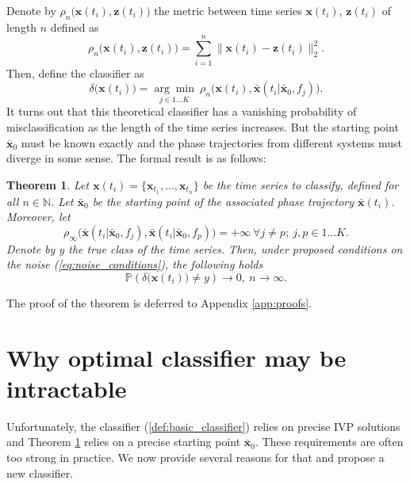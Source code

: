 \documentclass[referee, pdflatex, sn-mathphys-num]{sn-jnl}
\theoremstyle{definition}
\theoremstyle{plain}
\newtheorem{Th}{Theorem}
\newcommand{\bz}{\ensuremath{\mathbf{z}}}
\newcommand{\bx}{\ensuremath{\mathbf{x}}}
\newcommand{\bbx}{\ensuremath{\bar{\mathbf{x}}}}
\begin{document}
	Denote by $\rho_n\big( \bx(t_i), \bz(t_i) \big)$ the metric between time series $\bx(t_i)$, $\bz(t_i)$ of length $n$ defined as
	\begin{equation}\label{def:series_distance}
		\rho_n\big( \bx(t_i), \bz(t_i) \big) = \sum\limits_{i=1}^n \lVert \bx(t_i) - \bz(t_i) \rVert_2^2.
	\end{equation}
	Then, define the classifier as
	\begin{equation}\label{def:basic_classifier}
		\delta \big( \bx(t_i) \big) = \underset{j \in 1 \ldots K}{\arg\min} \ \rho_n\big( \bx(t_i), \bbx(t_i | \bbx_0, f_j) \big).
	\end{equation}
	It turns out that this theoretical classifier has a vanishing probability of misclassification as the length of the time series increases. But the starting point $\bbx_0$ must be known exactly and the phase trajectories from different systems must diverge in some sense. The formal result is as follows:
	\begin{Th}\label{thm:asympt_optimal}
		Let $\bx(t_i)= \{\bx_{t_1}, \ldots, \bx_{t_n}\}$ be the time series to classify, defined for all $n \in \mathbb{N}$. Let $\bbx_0$ be the starting point of the associated phase trajectory $\bbx(t_i)$. Moreover, let
		\begin{equation*}
			\rho_{\infty} \big( \bbx(t_i | \bbx_0, f_j), \bbx(t_i | \bbx_0, f_p) \big) = +\infty \ \forall j \not= p; \ j,p \in 1 \ldots K.
		\end{equation*}
		Denote by $y$ the true class of the time series. Then, under proposed conditions on the noise (\ref{eq:noise_conditions}), the following holds
		\begin{equation*}
			\mathbb{P}(\delta \big( \bx(t_i) \big) \not= y)  \to 0, \  n \to \infty.
		\end{equation*}
	\end{Th}
	The proof of the theorem is deferred to Appendix \ref{app:proofs}.
	
	\section{Why optimal classifier may be intractable}\label{sec:cls_problems}
	
	Unfortunately, the classifier (\ref{def:basic_classifier}) relies on precise IVP solutions and Theorem \ref{thm:asympt_optimal} relies on a precise starting point $\bbx_0$. These requirements are often too strong in practice. We now provide several reasons for that and propose a new classifier.
	
\end{document}
